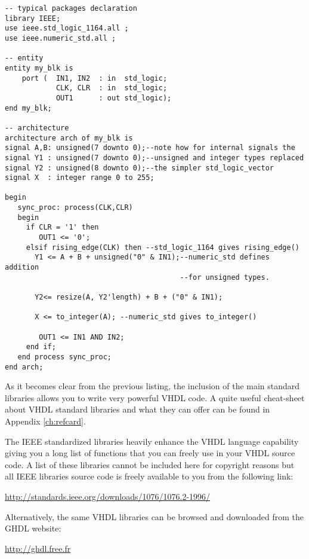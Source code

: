 \noindent
\begin{minipage}{0.99\linewidth}
\begin{lstlisting}[label=good_lib_ex, caption=Example of operators and types available with some IEEE packages.]
-- typical packages declaration
library IEEE;
use ieee.std_logic_1164.all ;
use ieee.numeric_std.all ;

-- entity
entity my_blk is
    port (  IN1, IN2  : in  std_logic;
            CLK, CLR  : in  std_logic;
            OUT1      : out std_logic);
end my_blk;

-- architecture
architecture arch of my_blk is
signal A,B: unsigned(7 downto 0);--note how for internal signals the
signal Y1 : unsigned(7 downto 0);--unsigned and integer types replaced
signal Y2 : unsigned(8 downto 0);--the simpler std_logic_vector
signal X  : integer range 0 to 255;

begin
   sync_proc: process(CLK,CLR)
   begin
     if CLR = '1' then
        OUT1 <= '0';
     elsif rising_edge(CLK) then --std_logic_1164 gives rising_edge()
       Y1 <= A + B + unsigned("0" & IN1);--numeric_std defines addition
                                         --for unsigned types.

       Y2<= resize(A, Y2'length) + B + ("0" & IN1);

       X <= to_integer(A); --numeric_std gives to_integer()

        OUT1 <= IN1 AND IN2;
     end if;
   end process sync_proc;
end arch;
\end{lstlisting}
\end{minipage}

As it becomes clear from the previous listing, the inclusion of the main standard libraries allows you to write very powerful VHDL code.
A quite useful cheat-sheet about VHDL standard libraries and what they can offer can be found in Appendix \ref{ch:refcard}.

The IEEE standardized libraries heavily enhance the VHDL language capability giving you a long list of functions that you can freely use in your VHDL source code. A list of these libraries cannot be included here for copyright reasons but all IEEE libraries source code is freely available to you from the following link:

\noindent
\url{http://standards.ieee.org/downloads/1076/1076.2-1996/}

\noindent
Alternatively, the same VHDL libraries can be browsed and downloaded from the GHDL website:

\noindent
\url{http://ghdl.free.fr}

